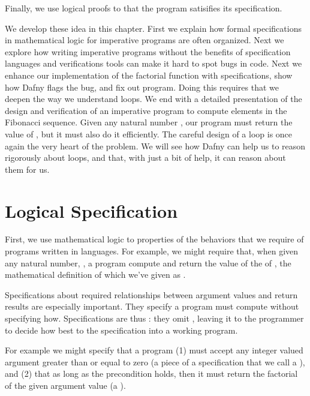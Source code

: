 \documentclass[letterpaper,10pt,english]{sphinxmanual}
\begin{document}
Finally, we use logical proofs to  that the program satisifies
its specification.

We develop these idea in this chapter. First we explain how formal
specifications in mathematical logic for imperative programs are often
organized. Next we explore how writing imperative programs without the
benefits of specification languages and verifications tools can make
it hard to spot bugs in code. Next we enhance our implementation of
the factorial function with specifications, show how Dafny flags the
bug, and fix out program. Doing this requires that we deepen the way
we understand loops. We end with a detailed presentation of the design
and verification of an imperative program to compute elements in the
Fibonacci sequence. Given any natural number , our program must
return the value of , but it must also do it efficiently.  The
careful design of a loop is once again the very heart of the problem.
We will see how Dafny can help us to reason rigorously about loops,
and that, with just a bit of help, it can reason about them for us.


\section{Logical Specification}
\label{\detokenize{05-putting-it-together:logical-specification}}
First, we use mathematical logic to  properties
of the behaviors that we require of programs written in 
languages. For example, we might require that, when given any natural
number, , a program compute and return the value of the 
of , the mathematical definition of which we’ve given as .

Specifications about required relationships between argument values
and return results are especially important. They specify  a
program must compute without specifying how. Specifications are thus
: they omit , leaving it to the
programmer to decide how best to  the specification into a
working program.

For example we might specify that a program (1) must accept any
integer valued argument greater than or equal to zero (a piece of a
specification that we call a ), and (2) that as long as
the precondition holds, then it must return the factorial of the given
argument value (a ).
\end{document}
